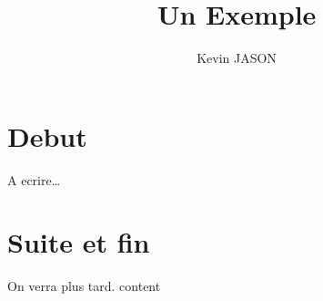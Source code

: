 \documentclass[a4paper,11pt]{article}
\author{K\’evin JASON}
\title{Un Exemple}
\begin{document}
\maketitle
\tableofcontents
\section{D\’ebut}
\‘A \’ecrire\dots
\section{Suite et fin}
On verra plus tard.
content
\end{document}
